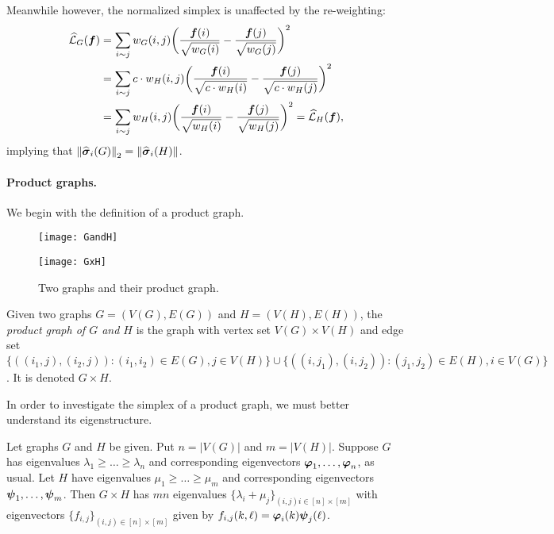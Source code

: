 Meanwhile however, the normalized simplex is unaffected by the re-weighting: 
\begin{align*}\widehat{\mathcal{L}}_G(\vb*{f})&=\sum_{i\sim j}w_G(i,j)\bigg(\frac{\vb*{f}(i)}{\sqrt{w_G(i)}}-\frac{\vb*{f}(j)}{\sqrt{w_G(j)}}\bigg)^2\\
&= \sum_{i\sim j}c\cdot w_H(i,j)\bigg(\frac{\vb*{f}(i)}{\sqrt{c\cdot w_H(i)}}-\frac{\vb*{f}(j)}{\sqrt{c\cdot w_H(j)}}\bigg)^2 \\
&= \sum_{i\sim j} w_H(i,j)\bigg(\frac{\vb*{f}(i)}{\sqrt{ w_H(i)}}-\frac{\vb*{f}(j)}{\sqrt{ w_H(j)}}\bigg)^2 = \widehat{\mathcal{L}}_H(\vb*{f}),
\end{align*}
implying that $\norm{\widehat{\vb*{\sigma}}_i(G)}_2 = \norm{\widehat{\vb*{\sigma}}_i(H)}$. 

\paragraph{Product graphs.}
We begin with the definition of a product graph. 

\begin{figure}
	\centering
	\begin{minipage}{0.45\textwidth}
		\centering
		\texttt{[image: GandH]}
	\end{minipage}
\begin{minipage}{0.45\textwidth}
	\centering
	\texttt{[image: GxH]}
\end{minipage}
\caption{Two graphs and their product graph.}
\end{figure}

\begin{definition}
	\label{def:product_graphs}
	Given two graphs $G=(V(G),E(G))$ and $H=(V(H), E(H))$, the \emph{product graph of $G$ and $H$} is the graph with vertex set $V(G)\times V(H)$ and edge set
	$\{((i_1,j),(i_2,j)):(i_1,i_2)\in E(G), j\in V(H)\}\cup\{((i,j_1),(i,j_2)):(j_1,j_2)\in E(H), i\in V(G)\}$. It is denoted $G\times H$. 
\end{definition} 

In order to investigate the simplex of a product graph, we must better understand its eigenstructure. 

\begin{lemma}
	\label{lem:prod_graph_eigenstructure}
	Let graphs $G$  and $H$ be given. Put $n=|V(G)|$ and $m=|V(H)|$. Suppose $G$ has eigenvalues $\lambda_1\geq \dots\geq \lambda_{n}$ and corresponding eigenvectors $\vb*{\varphi}_1,\dots,\vb*{\varphi}_{n}$, as usual. Let $H$ have eigenvalues $\mu_1\geq \dots\geq \mu_{m}$ and corresponding eigenvectors $\vb*{\psi}_1,\dots,\vb*{\psi}_{m}$. Then $G\times H$ has $mn$ eigenvalues $\{\lambda_i+\mu_j\}_{(i,j)i\in[n]\times[m]}$ with eigenvectors $\{f_{i,j}\}_{(i,j)\in[n]\times[m]}$ given by 
	$f_{i,j}(k,\ell) = \vb*{\varphi}_i(k)\vb*{\psi}_j(\ell)$. 
\end{lemma}

